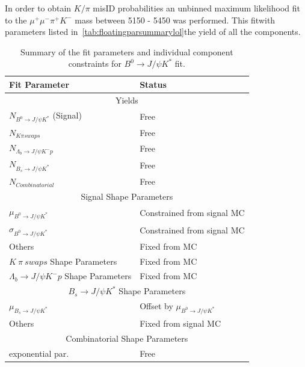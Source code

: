 In order to obtain $K/\pi$ misID probabilities an unbinned maximum likelihood fit to the $\mu^{+} \mu^{-} \pi^{+} K^{-}$ mass between 5150 - 5450 \mevcc was performed. This fit\DIFaddbegin \DIFadd{, }\DIFaddend with parameters listed in~\autoref{tab:floatingparsummarylol}\DIFdelbegin {}\DIFdelend \DIFaddbegin {}\DIFaddend the yield of all the components. 

\begin{table}[H]
\centering
\begin{tabular}{ l  l }\toprule
Fit Parameter & Status  \\ \hline
	\multicolumn{2}{c}{Yields} \\ \hline
$N_{B^{0} \rightarrow J/\psi K^{*}}$ (Signal)  &  Free \\
$N_{K \pi swaps}$ & Free\\
$N_{\Lambda_{b} \rightarrow J/\psi K^{-} p}$ & Free\\
$N_{B_{s} \rightarrow J/\psi K^{*}}$ & Free \\
$N_{Combinatorial}$ & Free\\
\hline
	\multicolumn{2}{c}{Signal Shape Parameters} \\
\hline
$\mu_{B^{0} \rightarrow J/\psi K^{*}}$ & Constrained from signal MC\\
$\sigma_{B^{0} \rightarrow J/\psi K^{*}}$ & Constrained from signal MC\\
Others & Fixed from MC\\
\hline
$K\ \pi\ swaps$ Shape Parameters & Fixed from MC \\
\hline
$\Lambda_{b} \rightarrow J/\psi K^{-} p$ Shape Parameters & Fixed from MC \\
\hline
	\multicolumn{2}{c}{${B_{s} \rightarrow J/\psi K^{*}}$ Shape Parameters} \\\hline
$\mu_{B_{s} \rightarrow J/\psi K^{*}}$ & Offset by $\mu_{B^{0} \rightarrow J/\psi K^{*}}$ \\
Others & Fixed from signal MC \\
\hline
	\multicolumn{2}{c}{Combinatorial Shape Parameters}  \\
\hline
exponential par.  & Free\\
\bottomrule
\end{tabular}
\caption{Summary of the fit parameters and individual component constraints for \DIFaddbeginFL {}\DIFaddendFL $B^{0} \rightarrow J/\psi K^{*}$ fit.}
\label{tab:floatingparsummarylol}
\end{table}






